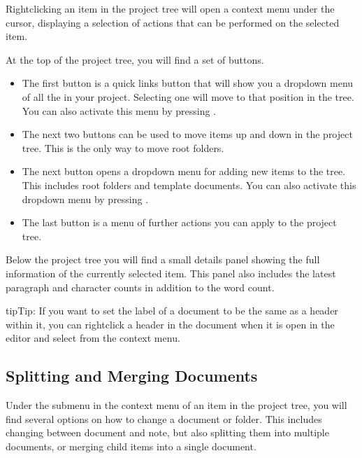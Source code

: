 \documentclass[a4paper,11pt,english]{sphinxmanual}
\begin{document}
\sphinxAtStartPar
Right\sphinxhyphen{}clicking an item in the project tree will open a context menu under the cursor, displaying
a selection of actions that can be performed on the selected item.

\sphinxAtStartPar
At the top of the project tree, you will find a set of buttons.
\begin{itemize}
\item {} 
\sphinxAtStartPar
The first button is a quick links button that will show you a dropdown menu of all the
{\hyperref[\detokenize{int_glossary:term-Root-Folder}]{}} in your project. Selecting one will move to that position in
the tree. You can also activate this menu by pressing .

\item {} 
\sphinxAtStartPar
The next two buttons can be used to move items up and down in the project tree. This is the only
way to move root folders.

\item {} 
\sphinxAtStartPar
The next button opens a dropdown menu for adding new items to the tree. This includes root
folders and template documents. You can also activate this dropdown menu by pressing
.

\item {} 
\sphinxAtStartPar
The last button is a menu of further actions you can apply to the project tree.

\end{itemize}

\sphinxAtStartPar
Below the project tree you will find a small details panel showing the full information of the
currently selected item. This panel also includes the latest paragraph and character counts in
addition to the word count.

\begin{sphinxadmonition}{tip}{Tip:}
\sphinxAtStartPar
If you want to set the label of a document to be the same as a header within it, you can
right\sphinxhyphen{}click a header in the document when it is open in the editor and select
 from the context menu.
\end{sphinxadmonition}


\subsection{Splitting and Merging Documents}
\label{\detokenize{usage_project:splitting-and-merging-documents}}\label{\detokenize{usage_project:a-ui-tree-split-merge}}
\sphinxAtStartPar
Under the  submenu in the context menu of an item in the project tree, you will find
several options on how to change a document or folder. This includes changing between document and
note, but also splitting them into multiple documents, or merging child items into a single
document.
\end{document}
